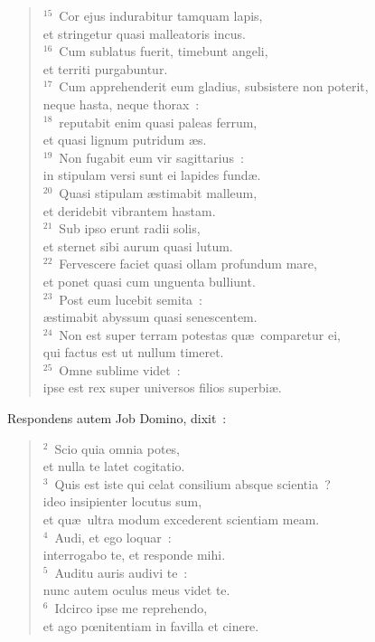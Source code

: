 \begin{flushleft}
\begin{verse}
${}^{15}$~Cor ejus indurabitur tamquam lapis,\\ et stringetur quasi malleatoris incus.\\
${}^{16}$~Cum sublatus fuerit, timebunt angeli,\\ et territi purgabuntur.\\
${}^{17}$~Cum apprehenderit eum gladius, subsistere non poterit,\\ neque hasta, neque thorax~:\\
${}^{18}$~reputabit enim quasi paleas ferrum,\\ et quasi lignum putridum \ae s.\\
${}^{19}$~Non fugabit eum vir sagittarius~:\\ in stipulam versi sunt ei lapides fund\ae .\\
${}^{20}$~Quasi stipulam \ae stimabit malleum,\\ et deridebit vibrantem hastam.\\
${}^{21}$~Sub ipso erunt radii solis,\\ et sternet sibi aurum quasi lutum.\\
${}^{22}$~Fervescere faciet quasi ollam profundum mare,\\ et ponet quasi cum unguenta bulliunt.\\
${}^{23}$~Post eum lucebit semita~:\\ \ae stimabit abyssum quasi senescentem.\\
${}^{24}$~Non est super terram potestas qu\ae\ comparetur ei,\\ qui factus est ut nullum timeret.\\
${}^{25}$~Omne sublime videt~:\\ ipse est rex super universos filios superbi\ae .\end{verse}\end{flushleft}



\lettrine[lines=10,image=true,loversize=0.05,lraise=-0.03]{R}{}espondens autem Job Domino, dixit~:
\begin{flushleft}\begin{verse}\vspace{6pt}${}^{2}$~Scio quia omnia potes,\\ et nulla te latet cogitatio.\\
${}^{3}$~Quis est iste qui celat consilium absque scientia~?\\ ideo insipienter locutus sum,\\ et qu\ae\ ultra modum excederent scientiam meam.\\
${}^{4}$~Audi, et ego loquar~:\\ interrogabo te, et responde mihi.\\
${}^{5}$~Auditu auris audivi te~:\\ nunc autem oculus meus videt te.\\
${}^{6}$~Idcirco ipse me reprehendo,\\ et ago pœnitentiam in favilla et cinere.\end{verse}\end{flushleft}


